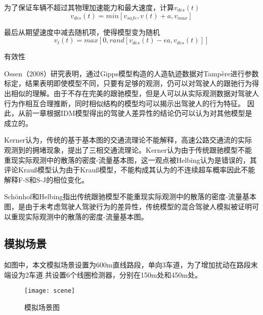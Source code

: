 为了保证车辆不超过其物理加速能力和最大速度，计算$v_{des}(t)$
\begin{equation}
v_{des}(t)=min[v_{safe},v(t)+a,v_{max}]
\end{equation}

最后从期望速度中减去随机项，使得模型变为随机
\begin{equation}
v_{t}(t)=max[0,rand[v_{des}(t)-\epsilon a,v_{des}(t)]]
\end{equation}



有效性

Ossen（2008）\cite{Ossen2008}研究表明，通过Gipps模型构造的人造轨迹数据对Tampère进行参数标定，结果表明即使模型不同，只要有足够的观测，仍可以对驾驶人的跟驰行为得出相似的理解。由于不存在完美的跟驰模型，但是人可以从实际观测数据对驾驶人行为作相互合理推断，同时相似结构的模型均可以揭示出驾驶人的行为特征。
因此，从前一章根据IDM模型得出的驾驶人差异性的结论仍可以认为对其他模型是成立的。




Kerner\cite{S.Kerner2009}认为，传统的基于基本图的交通流理论不能解释，高速公路交通流的实际观测到的拥堵现象，提出了三相交通流理论。Kerner认为由于传统跟驰模型不能重现实际观测中的散落的密度-流量基本图，这一观点被Helbing认为是错误的，其评论Krauß模型认为由于Krauß模型，不能构成其认为的不连续超车概率因此不能解释F-S和S-J的相位变化。

Schönhof和Helbing\cite{Schoenhof2009}指出传统跟驰模型不能重现实际观测中的散落的密度-流量基本图，是由于未考虑驾驶人驾驶行为的差异性，传统模型的混合驾驶人模拟被证明可以重现实际观测中的散落的密度-流量基本图。



\subsection{模拟场景}


如图中，本文模拟场景设置为600m直线路段，单向3车道，为了增加扰动在路段末端设为2车道.共设置6个线圈检测器，分别在150m处和450m处。

\begin{figure}[!htb]
\begin{center}
\texttt{[image: scene]}
\end{center}
\caption{模拟场景图}
\label{scene}
\end{figure}

